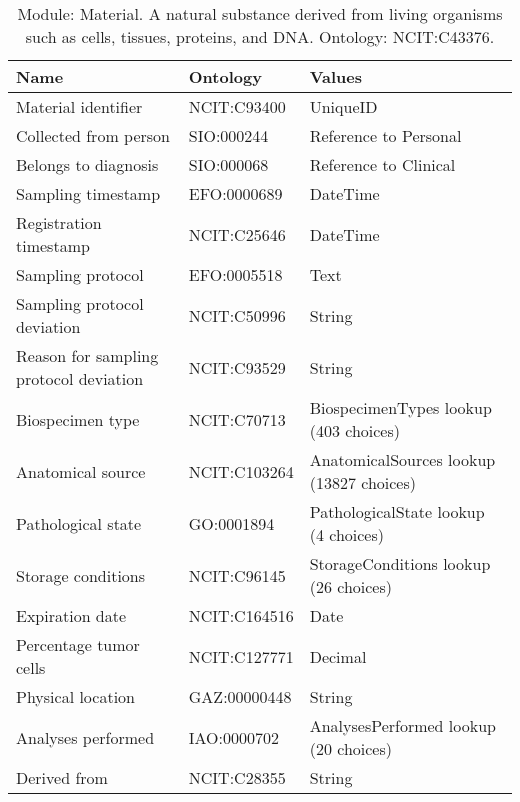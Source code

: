 \documentclass{article}
\begin{document}
\begin{table}[htb]
\begin{tabular}{lll}
Name & Ontology & Values \\
\hline
Material identifier & NCIT:C93400 & UniqueID \\
Collected from person & SIO:000244 & Reference to Personal \\
Belongs to diagnosis & SIO:000068 & Reference to Clinical \\
Sampling timestamp & EFO:0000689 & DateTime \\
Registration timestamp & NCIT:C25646 & DateTime \\
Sampling protocol & EFO:0005518 & Text \\
Sampling protocol deviation & NCIT:C50996 & String \\
Reason for sampling protocol deviation & NCIT:C93529 & String \\
Biospecimen type & NCIT:C70713 & BiospecimenTypes lookup (403 choices) \\
Anatomical source & NCIT:C103264 & AnatomicalSources lookup (13827 choices) \\
Pathological state & GO:0001894 & PathologicalState lookup (4 choices) \\
Storage conditions & NCIT:C96145 & StorageConditions lookup (26 choices) \\
Expiration date & NCIT:C164516 & Date \\
Percentage tumor cells & NCIT:C127771 & Decimal \\
Physical location & GAZ:00000448 & String \\
Analyses performed & IAO:0000702 & AnalysesPerformed lookup (20 choices) \\
Derived from & NCIT:C28355 & String \\
\hline
\end{tabular}
\caption[Module: Material]{\label{table:table7} Module: Material. A natural substance derived from living organisms such as cells, tissues, proteins, and DNA. Ontology: NCIT:C43376. }
\end{table}
\end{document}
